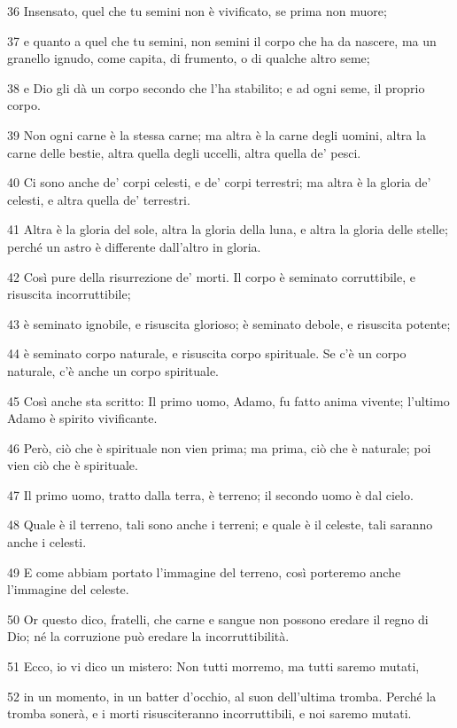 \par 36 Insensato, quel che tu semini non è vivificato, se prima non muore;
\par 37 e quanto a quel che tu semini, non semini il corpo che ha da nascere, ma un granello ignudo, come capita, di frumento, o di qualche altro seme;
\par 38 e Dio gli dà un corpo secondo che l'ha stabilito; e ad ogni seme, il proprio corpo.
\par 39 Non ogni carne è la stessa carne; ma altra è la carne degli uomini, altra la carne delle bestie, altra quella degli uccelli, altra quella de' pesci.
\par 40 Ci sono anche de' corpi celesti, e de' corpi terrestri; ma altra è la gloria de' celesti, e altra quella de' terrestri.
\par 41 Altra è la gloria del sole, altra la gloria della luna, e altra la gloria delle stelle; perché un astro è differente dall'altro in gloria.
\par 42 Così pure della risurrezione de' morti. Il corpo è seminato corruttibile, e risuscita incorruttibile;
\par 43 è seminato ignobile, e risuscita glorioso; è seminato debole, e risuscita potente;
\par 44 è seminato corpo naturale, e risuscita corpo spirituale. Se c'è un corpo naturale, c'è anche un corpo spirituale.
\par 45 Così anche sta scritto: Il primo uomo, Adamo, fu fatto anima vivente; l'ultimo Adamo è spirito vivificante.
\par 46 Però, ciò che è spirituale non vien prima; ma prima, ciò che è naturale; poi vien ciò che è spirituale.
\par 47 Il primo uomo, tratto dalla terra, è terreno; il secondo uomo è dal cielo.
\par 48 Quale è il terreno, tali sono anche i terreni; e quale è il celeste, tali saranno anche i celesti.
\par 49 E come abbiam portato l'immagine del terreno, così porteremo anche l'immagine del celeste.
\par 50 Or questo dico, fratelli, che carne e sangue non possono eredare il regno di Dio; né la corruzione può eredare la incorruttibilità.
\par 51 Ecco, io vi dico un mistero: Non tutti morremo, ma tutti saremo mutati,
\par 52 in un momento, in un batter d'occhio, al suon dell'ultima tromba. Perché la tromba sonerà, e i morti risusciteranno incorruttibili, e noi saremo mutati.
